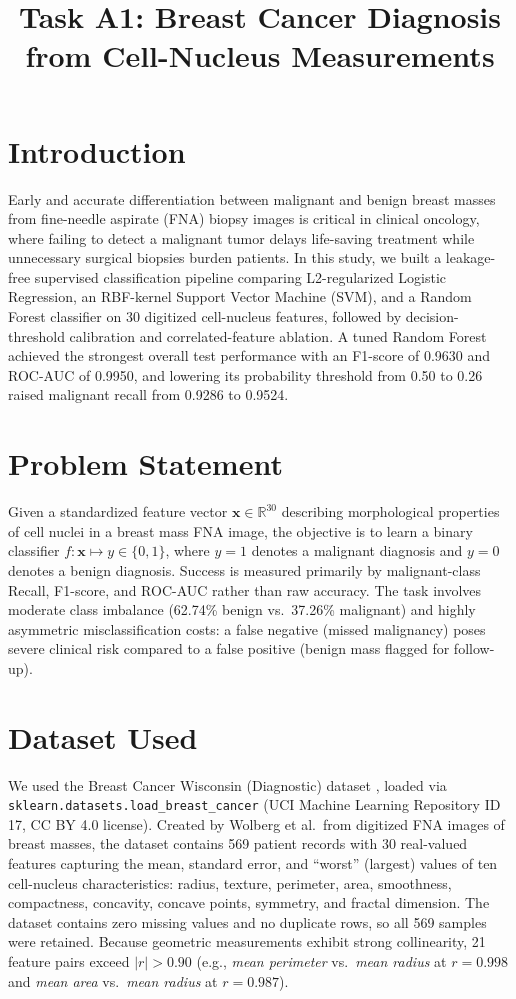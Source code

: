 \documentclass[conference,a4paper]{IEEEtran}
\title{Task A1: Breast Cancer Diagnosis from Cell-Nucleus Measurements}
\author{
\IEEEauthorblockN{Aliaan Shams \quad Roll No. 70177202 \quad Section C}
\IEEEauthorblockA{Department of Intelligent Systems, The University of Lahore (AI-101) \\
Repository: \url{https://github.com/Aliaan-70177202/AI101-ML-Assignment-70177202} \\
Instructor: Dr. Muhammad Awais, AI Architect}
}
\begin{document}
\maketitle

\section{Introduction}
Early and accurate differentiation between malignant and benign breast masses from fine-needle aspirate (FNA) biopsy images is critical in clinical oncology, where failing to detect a malignant tumor delays life-saving treatment while unnecessary surgical biopsies burden patients. In this study, we built a leakage-free supervised classification pipeline comparing L2-regularized Logistic Regression, an RBF-kernel Support Vector Machine (SVM), and a Random Forest classifier on 30 digitized cell-nucleus features, followed by decision-threshold calibration and correlated-feature ablation. A tuned Random Forest achieved the strongest overall test performance with an F1-score of 0.9630 and ROC-AUC of 0.9950, and lowering its probability threshold from 0.50 to 0.26 raised malignant recall from 0.9286 to 0.9524.

\section{Problem Statement}
Given a standardized feature vector $\mathbf{x} \in \mathbb{R}^{30}$ describing morphological properties of cell nuclei in a breast mass FNA image, the objective is to learn a binary classifier $f: \mathbf{x} \mapsto y \in \{0, 1\}$, where $y = 1$ denotes a malignant diagnosis and $y = 0$ denotes a benign diagnosis. Success is measured primarily by malignant-class Recall, F1-score, and ROC-AUC rather than raw accuracy. The task involves moderate class imbalance (62.74\% benign vs.\ 37.26\% malignant) and highly asymmetric misclassification costs: a false negative (missed malignancy) poses severe clinical risk compared to a false positive (benign mass flagged for follow-up).

\section{Dataset Used}
We used the Breast Cancer Wisconsin (Diagnostic) dataset \cite{uci_bc}, loaded via \texttt{sklearn.datasets.load\_breast\_cancer} (UCI Machine Learning Repository ID 17, CC BY 4.0 license). Created by Wolberg et al.\ from digitized FNA images of breast masses, the dataset contains 569 patient records with 30 real-valued features capturing the mean, standard error, and ``worst'' (largest) values of ten cell-nucleus characteristics: radius, texture, perimeter, area, smoothness, compactness, concavity, concave points, symmetry, and fractal dimension. The dataset contains zero missing values and no duplicate rows, so all 569 samples were retained. Because geometric measurements exhibit strong collinearity, 21 feature pairs exceed $|r| > 0.90$ (e.g., \textit{mean perimeter} vs.\ \textit{mean radius} at $r = 0.998$ and \textit{mean area} vs.\ \textit{mean radius} at $r = 0.987$).
\end{document}

